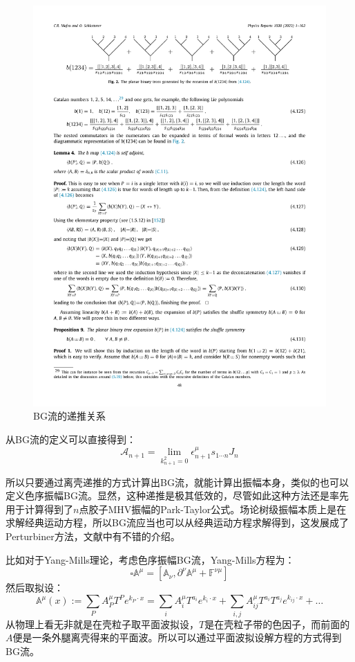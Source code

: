 \begin{figure}[htbp]
	\centering
	\includegraphics{figs/fig15.pdf}
	\caption{BG流的递推关系}
	\label{fig:6.7}
\end{figure}
从BG流的定义可以直接得到：
\begin{equation}
	\mathcal{A}_{n+1} =\lim_{k^2_{n+1}=0} \epsilon^\mu_{n+1}s_{1\cdots n}J_n
\end{equation}

所以只要通过离壳递推的方式计算出BG流，就能计算出振幅本身，类似的也可以定义色序振幅BG流。显然，这种递推是极其低效的，尽管如此这种方法还是率先用于计算得到了$n$点胶子MHV振幅的Park-Taylor公式\cite{Dixon:1996wi,Mangano:1990by}。场论树级振幅本质上是在求解经典运动方程，所以BG流应当也可以从经典运动方程求解得到，这发展成了Perturbiner方法，文献\cite{Mizera:2018jbh}中有不错的介绍。

比如对于Yang-Mills理论，考虑色序振幅BG流，Yang-Mills方程为：
\begin{equation}
	\square\mathbb{A}^{\mu}=[\mathbb{A}_{\nu},\partial^{\nu}\mathbb{A}^{\mu}+\mathbb{F}^{\nu\mu}]
\end{equation}
然后取拟设：
\begin{equation}
	\mathbb{A}^\mu(x):=\sum_PA_P^\mu T^Pe^{k_P\cdot x}=\sum_iA_i^\mu T^{a_i}e^{k_i\cdot x}+\sum_{i,j}A_{ij}^\mu T^{a_i}T^{a_j}e^{k_{ij}\cdot x}+\ldots
\end{equation}
从物理上看无非就是在壳粒子取平面波拟设，$T$是在壳粒子带的色因子，而前面的$A$便是一条外腿离壳得来的平面波。所以可以通过平面波拟设解方程的方式得到BG流。

